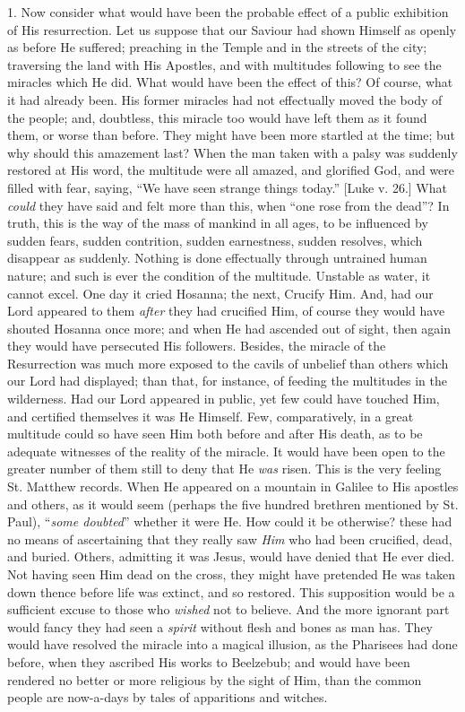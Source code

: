 1. Now consider what would have been the probable
effect of a public exhibition of His resurrection. Let us
suppose that our Saviour had shown Himself as openly as
before He suffered; preaching in the Temple and in the
streets of the city; traversing the land with His
Apostles, and with multitudes following to see
the miracles which He did. What would have been the effect of this? Of course, what it had already been. His
former miracles had not effectually moved the body of the
people; and, doubtless, this miracle too would have left
them as it found them, or worse than before. They might
have been more startled at the time; but why should this
amazement last? When the man taken with a palsy was
suddenly restored at His word, the multitude were all
amazed, and glorified God, and were filled with fear,
saying, ``We have seen strange things today.''
[Luke v. 26.] What \emph{could} they have said and felt
more than this, when ``one rose from the dead''?
In truth, this is the way of the mass of mankind in all
ages, to be influenced by sudden fears, sudden
contrition, sudden earnestness, sudden resolves, which
disappear as suddenly. Nothing is done effectually
through untrained human nature; and such is ever the
condition of the multitude. Unstable as water, it cannot
excel. One day it cried Hosanna; the next, Crucify Him.
And, had our Lord appeared to them \emph{after} they had
crucified Him, of course they would have shouted Hosanna
once more; and when He had ascended out of sight, then
again they would have persecuted His followers. Besides,
the miracle of the Resurrection was much more exposed to
the cavils of unbelief than others which our Lord had
displayed; than that, for instance, of feeding the
multitudes in the wilderness. Had our Lord appeared in
public, yet few could have touched Him, and certified
themselves it was He Himself. Few, comparatively, in a
great multitude could so have seen Him both before and
after His death, as to be adequate witnesses of the
reality of the miracle. It would have been open to the
greater number of them still to deny that He \emph{was}
risen. This is the very feeling St. Matthew records. When
He appeared on a mountain in Galilee to His apostles and
others, as it would seem (perhaps the five hundred
brethren mentioned by St. Paul), ``\emph{some doubted}''
whether it were He. How could it be otherwise? these had
no means of ascertaining that they really saw \emph{Him}
who had been crucified, dead, and buried. Others,
admitting it was Jesus, would have denied that He ever
died. Not having seen Him dead on the cross, they might
have pretended He was taken down thence before life was
extinct, and so restored. This supposition would be a
sufficient excuse to those who \emph{wished} not to
believe. And the more ignorant part would fancy they had
seen a \emph{spirit} without flesh and bones as man has.
They would have resolved the miracle into a magical
illusion, as the Pharisees had done before, when they
ascribed His works to Beelzebub; and would have been
rendered no better or more religious by the sight of Him,
than the common people are now-a-days by tales of
apparitions and witches.


